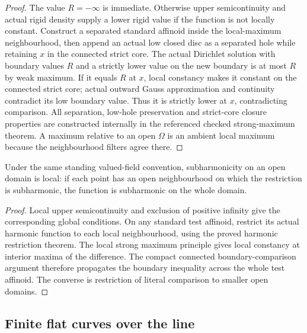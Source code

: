 \begin{proof}
The value $R=-\infty$ is immediate. Otherwise upper semicontinuity and actual
rigid density supply a lower rigid value if the function is not locally constant.
Construct a separated standard affinoid inside the local-maximum neighbourhood,
then append an actual low closed disc as a separated hole while retaining $x$
in the connected strict core. The actual Dirichlet solution with boundary values
$R$ and a strictly lower value on the new boundary is at most $R$ by weak maximum.
If it equals $R$ at $x$, local constancy makes it constant on the connected strict
core; actual outward Gauss approximation and continuity contradict its low boundary
value. Thus it is strictly lower at $x$, contradicting comparison. All separation,
low-hole preservation and strict-core closure properties are constructed internally
in the referenced checked strong-maximum theorem. A maximum relative to an open
$\Omega$ is an ambient local maximum because the neighbourhood filters agree there.
\end{proof}

\begin{lemma}[Locality]\label{lem:fc-line-local}
\leanok
{}
Under the same standing valued-field convention, subharmonicity on an open domain
is local: if each point has an open neighbourhood on which the restriction is
subharmonic, the function is subharmonic on the whole domain.
\end{lemma}

\begin{proof}
Local upper semicontinuity and exclusion of positive infinity give the corresponding
global conditions. On any standard test affinoid, restrict its actual harmonic
function to each local neighbourhood, using the proved harmonic restriction theorem.
The local strong maximum principle gives local constancy at interior maxima of
the difference. The compact connected boundary-comparison argument therefore
propagates the boundary inequality across the whole test affinoid. The converse
is restriction of literal comparison to smaller open domains.
\end{proof}

\subsection{Finite flat curves over the line}\label{subsec:fc-pieces}

